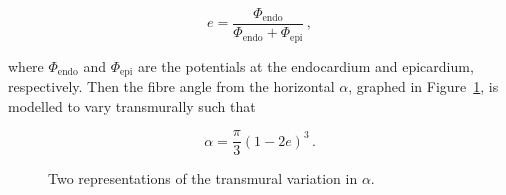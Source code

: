     \begin{equation}
      e = \frac{\Phi_\text{endo}}{\Phi_\text{endo}+\Phi_\text{epi}}\,,
    \end{equation}

    where $\Phi_\text{endo}$ and $\Phi_\text{epi}$ are the potentials at the endocardium and epicardium, respectively. Then the fibre angle from the horizontal $\alpha$, graphed in Figure~\ref{fig:transmural_variation}, is modelled to vary transmurally such that

    \begin{equation}
      \alpha = \frac{\pi}{3} \left( 1 - 2e \right)^3\,.
    \end{equation}
    
    \begin{figure}[htbp]
      \centering
       \qquad
      \caption{Two representations of the transmural variation in $\alpha$.}
      \label{fig:transmural_variation}
    \end{figure}

